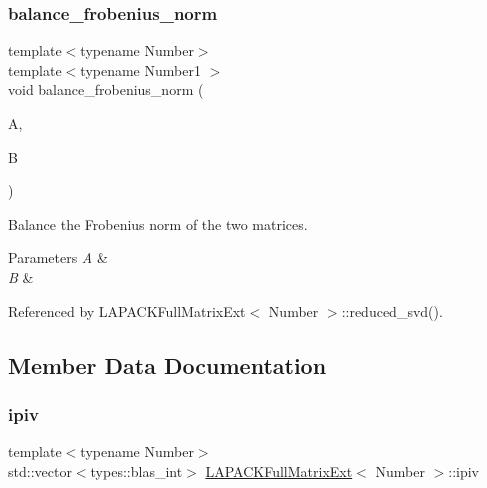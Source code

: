 \subsubsection{\texorpdfstring{balance\+\_\+frobenius\+\_\+norm}{balance\_frobenius\_norm}}
{\footnotesize\ttfamily template$<$typename Number$>$ \\
template$<$typename Number1 $>$ \\
void balance\+\_\+frobenius\+\_\+norm (\begin{DoxyParamCaption}\item[{\hyperlink{classLAPACKFullMatrixExt}{L\+A\+P\+A\+C\+K\+Full\+Matrix\+Ext}$<$ Number1 $>$ \&}]{A,  }\item[{\hyperlink{classLAPACKFullMatrixExt}{L\+A\+P\+A\+C\+K\+Full\+Matrix\+Ext}$<$ Number1 $>$ \&}]{B }\end{DoxyParamCaption})\hspace{0.3cm}{\ttfamily [friend]}}

Balance the Frobenius norm of the two matrices.


\begin{DoxyParams}{Parameters}
{\em A} & \\
\hline
{\em B} & \\
\hline
\end{DoxyParams}


Referenced by L\+A\+P\+A\+C\+K\+Full\+Matrix\+Ext$<$ Number $>$\+::reduced\+\_\+svd().



\subsection{Member Data Documentation}
\mbox{\label{classLAPACKFullMatrixExt_a436d7290d5b2b17c0691b5b63cca36fa}} 
\subsubsection{\texorpdfstring{ipiv}{ipiv}}
{\footnotesize\ttfamily template$<$typename Number$>$ \\
std\+::vector$<$types\+::blas\+\_\+int$>$ \hyperlink{classLAPACKFullMatrixExt}{L\+A\+P\+A\+C\+K\+Full\+Matrix\+Ext}$<$ Number $>$\+::ipiv\hspace{0.3cm}{\ttfamily [private]}}

